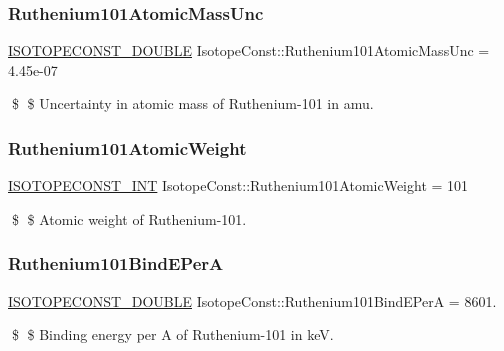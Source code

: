 \subsubsection{\texorpdfstring{Ruthenium101\+Atomic\+Mass\+Unc}{Ruthenium101AtomicMassUnc}}
{\footnotesize\ttfamily \mbox{\hyperlink{group___isotope_const-_macros_ga8f45a7272ce02c0b4c65c44636ed719a}{I\+S\+O\+T\+O\+P\+E\+C\+O\+N\+S\+T\+\_\+\+D\+O\+U\+B\+LE}} Isotope\+Const\+::\+Ruthenium101\+Atomic\+Mass\+Unc = 4.\+45e-\/07}

\$ \$ Uncertainty in atomic mass of Ruthenium-\/101 in amu. \mbox{\label{group___isotope_const-_ruthenium-_ru101_ga1053306da28a56f574222ee4eb7f428b}} 
\subsubsection{\texorpdfstring{Ruthenium101\+Atomic\+Weight}{Ruthenium101AtomicWeight}}
{\footnotesize\ttfamily \mbox{\hyperlink{group___isotope_const-_macros_ga5f18360b3e99483a35c32d789e62621c}{I\+S\+O\+T\+O\+P\+E\+C\+O\+N\+S\+T\+\_\+\+I\+NT}} Isotope\+Const\+::\+Ruthenium101\+Atomic\+Weight = 101}

\$ \$ Atomic weight of Ruthenium-\/101. \mbox{\label{group___isotope_const-_ruthenium-_ru101_ga43cd04fb4f3ccd710865ec0bee832e35}} 
\subsubsection{\texorpdfstring{Ruthenium101\+Bind\+E\+PerA}{Ruthenium101BindEPerA}}
{\footnotesize\ttfamily \mbox{\hyperlink{group___isotope_const-_macros_ga8f45a7272ce02c0b4c65c44636ed719a}{I\+S\+O\+T\+O\+P\+E\+C\+O\+N\+S\+T\+\_\+\+D\+O\+U\+B\+LE}} Isotope\+Const\+::\+Ruthenium101\+Bind\+E\+PerA = 8601.}

\$ \$ Binding energy per A of Ruthenium-\/101 in keV. \mbox{\label{group___isotope_const-_ruthenium-_ru101_ga3ef74a23d77c7786bafb1c72b249d5df}} 
